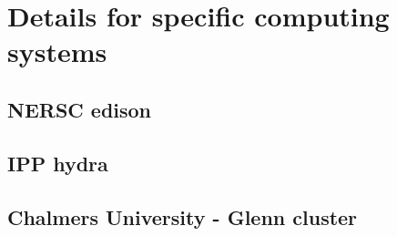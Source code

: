 \chapter{Details for specific computing systems}

\section{NERSC edison}

\section{IPP hydra}

\section{Chalmers University - Glenn cluster}
